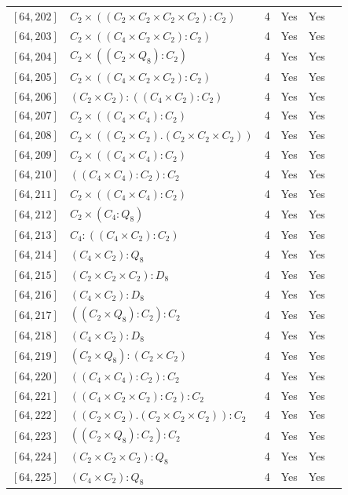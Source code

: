 \documentclass[12pt, a4paper]{article}
\theoremstyle{plain}
\theoremstyle{definition}
\begin{document}
\begin{longtable}{llcccl}
  $[64,202]$ & $C_2 \times ((C_2 \times C_2 \times C_2 \times C_2) : C_2)$ & 4 & Yes & Yes \\
  $[64,203]$ & $C_2 \times ((C_4 \times C_2 \times C_2) : C_2)$ & 4 & Yes & Yes \\
  $[64,204]$ & $C_2 \times ((C_2 \times Q_8) : C_2)$ & 4 & Yes & Yes \\
  $[64,205]$ & $C_2 \times ((C_4 \times C_2 \times C_2) : C_2)$ & 4 & Yes & Yes \\
  $[64,206]$ & $(C_2 \times C_2) : ((C_4 \times C_2) : C_2)$ & 4 & Yes & Yes \\
  $[64,207]$ & $C_2 \times ((C_4 \times C_4) : C_2)$ & 4 & Yes & Yes \\
  $[64,208]$ & $C_2 \times ((C_2 \times C_2) . (C_2 \times C_2 \times C_2))$ & 4 & Yes & Yes \\
  $[64,209]$ & $C_2 \times ((C_4 \times C_4) : C_2)$ & 4 & Yes & Yes \\
  $[64,210]$ & $((C_4 \times C_4) : C_2) : C_2$ & 4 & Yes & Yes \\
  $[64,211]$ & $C_2 \times ((C_4 \times C_4) : C_2)$ & 4 & Yes & Yes \\
  $[64,212]$ & $C_2 \times (C_4 : Q_8)$ & 4 & Yes & Yes \\
  $[64,213]$ & $C_4 : ((C_4 \times C_2) : C_2)$ & 4 & Yes & Yes \\
  $[64,214]$ & $(C_4 \times C_2) : Q_8$ & 4 & Yes & Yes \\
  $[64,215]$ & $(C_2 \times C_2 \times C_2) : D_8$ & 4 & Yes & Yes \\
  $[64,216]$ & $(C_4 \times C_2) : D_8$ & 4 & Yes & Yes \\
  $[64,217]$ & $((C_2 \times Q_8) : C_2) : C_2$ & 4 & Yes & Yes \\
  $[64,218]$ & $(C_4 \times C_2) : D_8$ & 4 & Yes & Yes \\
  $[64,219]$ & $(C_2 \times Q_8) : (C_2 \times C_2)$ & 4 & Yes & Yes \\
  $[64,220]$ & $((C_4 \times C_4) : C_2) : C_2$ & 4 & Yes & Yes \\
  $[64,221]$ & $((C_4 \times C_2 \times C_2) : C_2) : C_2$ & 4 & Yes & Yes \\
  $[64,222]$ & $((C_2 \times C_2) . (C_2 \times C_2 \times C_2)) : C_2$ & 4 & Yes & Yes \\
  $[64,223]$ & $((C_2 \times Q_8) : C_2) : C_2$ & 4 & Yes & Yes \\
  $[64,224]$ & $(C_2 \times C_2 \times C_2) : Q_8$ & 4 & Yes & Yes \\
  $[64,225]$ & $(C_4 \times C_2) : Q_8$ & 4 & Yes & Yes \\

\end{longtable}
\end{document}
